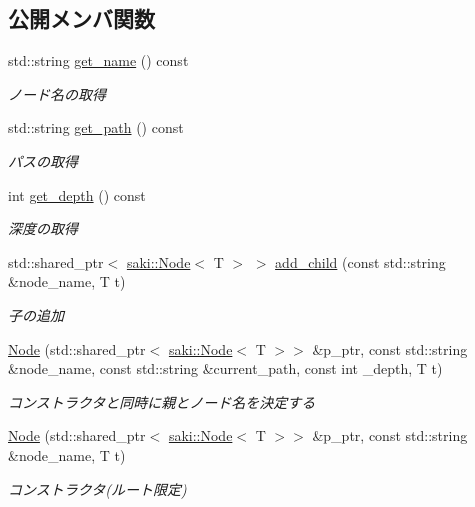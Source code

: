 \subsection*{公開メンバ関数}
\begin{DoxyCompactItemize}
\item 
std\+::string \mbox{\hyperlink{classsaki_1_1_node_ab0daef362cc404496f170b3ef0a355f0}{get\+\_\+name}} () const
\begin{DoxyCompactList}\small\item\em ノード名の取得 \end{DoxyCompactList}\item 
std\+::string \mbox{\hyperlink{classsaki_1_1_node_a5aa0d398aa417048879bc71d51ce2aa3}{get\+\_\+path}} () const
\begin{DoxyCompactList}\small\item\em パスの取得 \end{DoxyCompactList}\item 
int \mbox{\hyperlink{classsaki_1_1_node_a8351b7ef227bc1f97f4d82748d6aa2a3}{get\+\_\+depth}} () const
\begin{DoxyCompactList}\small\item\em 深度の取得 \end{DoxyCompactList}\item 
std\+::shared\+\_\+ptr$<$ \mbox{\hyperlink{classsaki_1_1_node}{saki\+::\+Node}}$<$ T $>$ $>$ \mbox{\hyperlink{classsaki_1_1_node_a71c9426a0fb8515ff555011c36872d3f}{add\+\_\+child}} (const std\+::string \&node\+\_\+name, T t)
\begin{DoxyCompactList}\small\item\em 子の追加 \end{DoxyCompactList}\item 
\mbox{\hyperlink{classsaki_1_1_node_ae35de0e71bbc17a57e711fcfd5c94634}{Node}} (std\+::shared\+\_\+ptr$<$ \mbox{\hyperlink{classsaki_1_1_node}{saki\+::\+Node}}$<$ T $>$$>$ \&p\+\_\+ptr, const std\+::string \&node\+\_\+name, const std\+::string \&current\+\_\+path, const int \+\_\+depth, T t)
\begin{DoxyCompactList}\small\item\em コンストラクタと同時に親とノード名を決定する \end{DoxyCompactList}\item 
\mbox{\hyperlink{classsaki_1_1_node_a343b336e89a9503e5b695e3072d32be2}{Node}} (std\+::shared\+\_\+ptr$<$ \mbox{\hyperlink{classsaki_1_1_node}{saki\+::\+Node}}$<$ T $>$$>$ \&p\+\_\+ptr, const std\+::string \&node\+\_\+name, T t)
\begin{DoxyCompactList}\small\item\em コンストラクタ(ルート限定) \end{DoxyCompactList}\item 

\end{DoxyCompactItemize}
